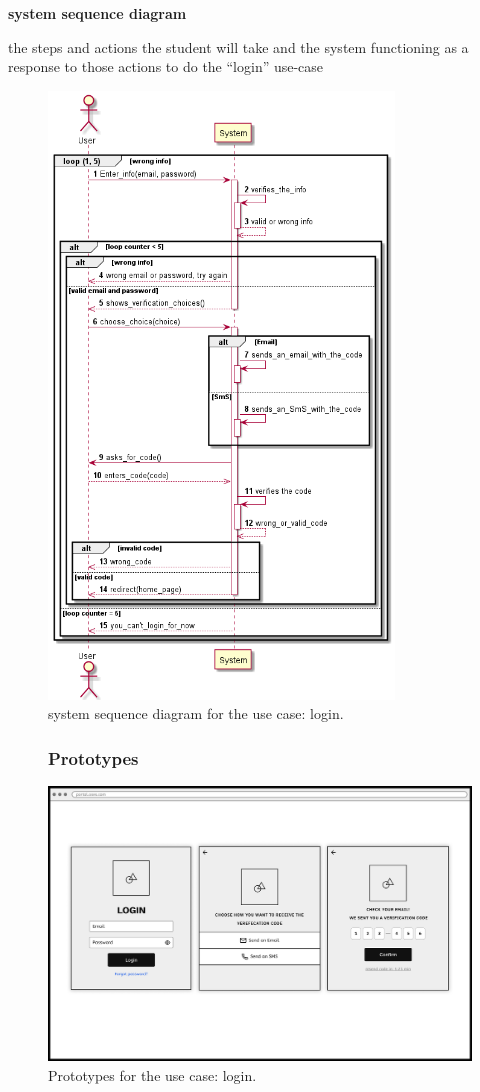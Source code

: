 \documentclass[]{uc2pfecaneva}
\begin{document}
    \raggedright\textbf{system sequence diagram}\linebreak
    \raggedright{the steps and actions the student will take and the system functioning as a response
    to those actions to do the “login” use-case}
    \begin{figure}[h]
        \includegraphics[width=260pt]{images/Login_dss}
        \caption{system sequence diagram for the use case: login.}
    \end{figure}
    \clearpage


    \begin{figure}[h]
        \subsubsection{Prototypes}
        \includegraphics[width=\textwidth]{images/login1}
        \caption{Prototypes for the use case: login.}
    \end{figure}
    \clearpage
\end{document}
